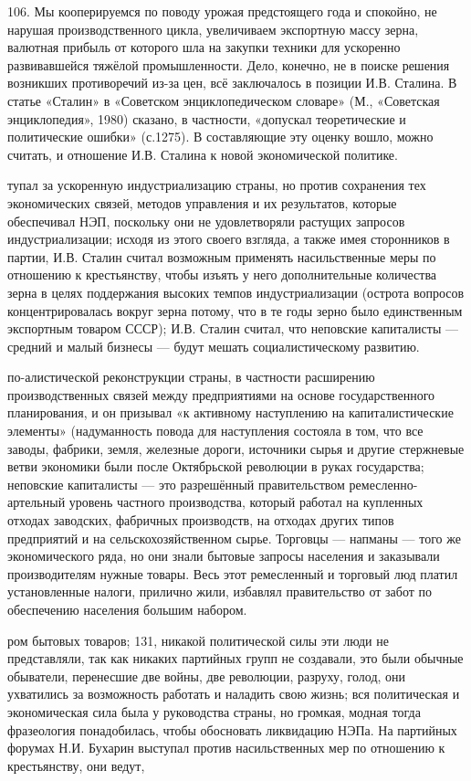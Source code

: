 \label{108-1}
106. Мы кооперируемся по поводу урожая предстоящего года и спокойно, не нарушая производственного цикла, увеличиваем экспортную массу зерна, валютная прибыль от которого шла на закупки техники для ускоренно развивавшейся тяжёлой промышленности. Дело, конечно, не в поиске решения возникших противоречий из-за цен, всё заключалось в позиции И.В. Сталина. В статье «Сталин» в «Советском энциклопедическом словаре» (М., «Советская энциклопедия», 1980) сказано, в частности, «допускал теоретические и политические ошибки» (с.1275). В составляющие эту оценку вошло, можно считать, и отношение И.В. Сталина к новой экономической политике.

\label{109-1}
тупал за ускоренную индустриализацию страны, но против сохранения тех экономических связей, методов управления и их результатов, которые обеспечивал НЭП, поскольку они не удовлетворяли растущих запросов индустриализации; исходя из этого своего взгляда, а также имея сторонников в партии, И.В. Сталин считал возможным применять насильственные меры по отношению к крестьянству, чтобы изъять у него дополнительные количества зерна в целях поддержания высоких темпов индустриализации (острота вопросов концентрировалась вокруг зерна потому, что в те годы зерно было единственным экспортным товаром СССР); И.В. Сталин считал, что неповские капиталисты — средний и малый бизнесы — будут мешать социалистическому развитию.

\label{110-1}
по-алистической реконструкции страны, в частности расширению производственных связей между предприятиями на основе государственного планирования, и он призывал «к активному наступлению на капиталистические элементы» (надуманность повода для наступления состояла в том, что все заводы, фабрики, земля, железные дороги, источники сырья и другие стержневые ветви экономики были после Октябрьской революции в руках государства; неповские капиталисты — это разрешённый правительством ремесленно-артельный уровень частного производства, который работал на купленных отходах заводских, фабричных производств, на отходах других типов предприятий и на сельскохозяйственном сырье. Торговцы — напманы — того же экономического ряда, но они знали бытовые запросы населения и заказывали производителям нужные товары. Весь этот ремесленный и торговый люд платил установленные налоги, прилично жили, избавлял правительство от забот по обеспечению населения большим набором.

\label{111-1}
ром бытовых товаров; 131, никакой политической силы эти люди не представляли, так как никаких партийных групп не создавали, это были обычные обыватели, перенесшие две войны, две революции, разруху, голод, они ухватились за возможность работать и наладить свою жизнь; вся политическая и экономическая сила была у руководства страны, но громкая, модная тогда фразеология понадобилась, чтобы обосновать ликвидацию НЭПа. На партийных форумах Н.И. Бухарин выступал против насильственных мер по отношению к крестьянству, они ведут,


